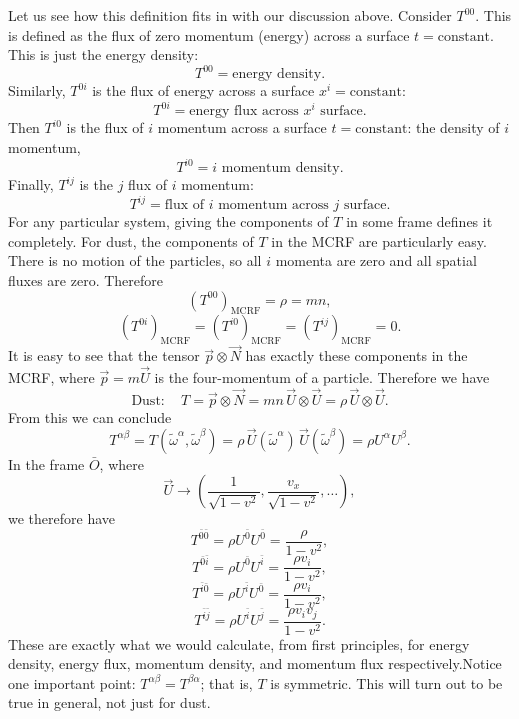 \documentclass[12pt]{book}
\begin{document}
    Let us see how this definition fits in with our discussion above. Consider \(T^{00}\). This is defined as the flux of zero momentum (energy) across a surface \(t = \text{constant}\). This is just the energy density:
    \[
    T^{00} = \text{energy density}. \tag{4.15}
    \]
    Similarly, \(T^{0i}\) is the flux of energy across a surface \(x^i = \text{constant}\):
    \[
    T^{0i} = \text{energy flux across \(x^i\) surface}. \tag{4.16}
    \]
    Then \(T^{i0}\) is the flux of \(i\) momentum across a surface \(t = \text{constant}\): the density of \(i\) momentum,
    \[
    T^{i0} = \text{\(i\) momentum density}. \tag{4.17}
    \]
    Finally, \(T^{ij}\) is the \(j\) flux of \(i\) momentum:
    \[
    T^{ij} = \text{flux of \(i\) momentum across \(j\) surface}. \tag{4.18}
    \]
    For any particular system, giving the components of \(T\) in some frame defines it completely. For dust, the components of \(T\) in the MCRF are particularly easy. There is no motion of the particles, so all \(i\) momenta are zero and all spatial fluxes are zero. Therefore
    \[
    (T^{00})_{\text{MCRF}} = \rho = mn,
    \]
    \[
    (T^{0i})_{\text{MCRF}} = (T^{i0})_{\text{MCRF}} = (T^{ij})_{\text{MCRF}} = 0.
    \]
    It is easy to see that the tensor \(\vec{p} \otimes \vec{N}\) has exactly these components in the MCRF, where \(\vec{p} = m\vec{U}\) is the four-momentum of a particle. Therefore we have
    \[
    \text{Dust}: \quad T = \vec{p} \otimes \vec{N} = mn \, \vec{U} \otimes \vec{U} = \rho \, \vec{U} \otimes \vec{U}. \tag{4.19}
    \]
    From this we can conclude
    \[
    T^{\alpha\beta} = T(\tilde{\omega}^\alpha, \tilde{\omega}^\beta) = \rho \, \vec{U}(\tilde{\omega}^\alpha) \, \vec{U}(\tilde{\omega}^\beta) = \rho U^\alpha U^\beta. \tag{4.20}
    \]
    In the frame \(\bar{O}\), where
    \[
    \vec{U} \rightarrow \left(\frac{1}{\sqrt{1 - v^2}}, \frac{v_x}{\sqrt{1 - v^2}}, \ldots \right),
    \]
    we therefore have
    \[
    T^{\bar{0}\bar{0}} = \rho U^{\bar{0}} U^{\bar{0}} = \frac{\rho}{1 - v^2},
    \]
    \[
    T^{\bar{0}\bar{i}} = \rho U^{\bar{0}} U^{\bar{i}} = \frac{\rho v_i}{1 - v^2},
    \]
    \[
    T^{\bar{i}\bar{0}} = \rho U^{\bar{i}} U^{\bar{0}} = \frac{\rho v_i}{1 - v^2},
    \]
    \[
    T^{\bar{i}\bar{j}} = \rho U^{\bar{i}} U^{\bar{j}} = \frac{\rho v_i v_j}{1 - v^2}.
    \tag{4.21}
    \]
    These are exactly what we would calculate, from first principles, for energy density, energy flux, momentum density, and momentum flux respectively.Notice one important point: \(T^{\alpha\beta} = T^{\beta\alpha}\); that is, \(T\) is symmetric. This will turn out to be true in general, not just for dust.
    
\end{document}
